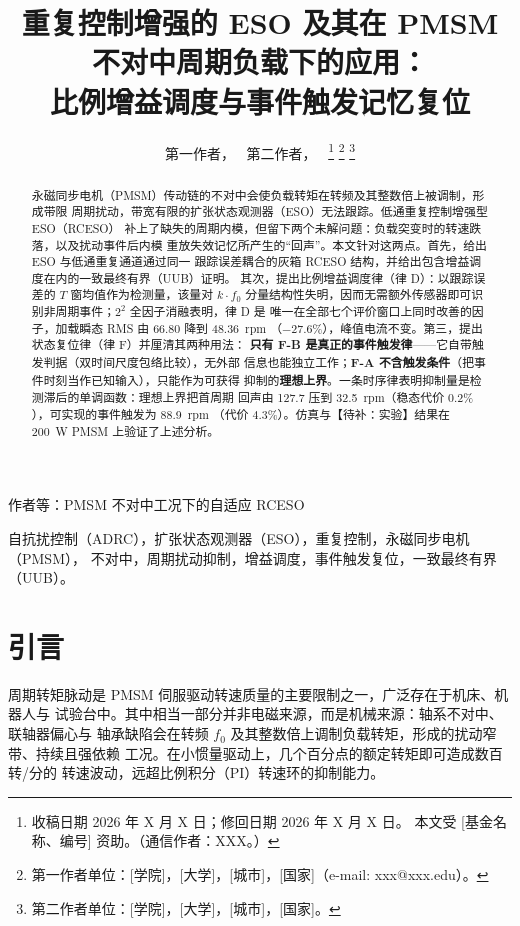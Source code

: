 \documentclass[journal]{IEEEtran}
\theoremstyle{remark}
\begin{document}
\title{重复控制增强的 ESO 及其在 PMSM 不对中周期负载下的应用：\\
比例增益调度与事件触发记忆复位}

\author{第一作者，~
        第二作者，~
\thanks{收稿日期 2026 年 X 月 X 日；修回日期 2026 年 X 月 X 日。
本文受 [基金名称、编号] 资助。（通信作者：XXX。）}
\thanks{第一作者单位：[学院]，[大学]，[城市]，[国家]（e-mail: xxx@xxx.edu）。}
\thanks{第二作者单位：[学院]，[大学]，[城市]，[国家]。}}

%
{作者等：PMSM 不对中工况下的自适应 RCESO}

\maketitle

\begin{abstract}
永磁同步电机（PMSM）传动链的不对中会使负载转矩在转频及其整数倍上被调制，形成带限
周期扰动，带宽有限的扩张状态观测器（ESO）无法跟踪。低通重复控制增强型 ESO（RCESO）
补上了缺失的周期内模，但留下两个未解问题：负载突变时的转速跌落，以及扰动事件后内模
重放失效记忆所产生的“回声”。本文针对这两点。首先，给出 ESO 与低通重复通道通过同一
跟踪误差耦合的灰箱 RCESO 结构，并给出包含增益调度在内的一致最终有界（UUB）证明。
其次，提出比例增益调度律（律 D）：以跟踪误差的 $T$ 窗均值作为检测量，该量对 $k\cdot f_0$
分量结构性失明，因而无需额外传感器即可识别非周期事件；$2^2$ 全因子消融表明，律 D 是
唯一在全部七个评价窗口上同时改善的因子，加载瞬态 RMS 由 66.80 降到 48.36~rpm
（$-27.6\%$），峰值电流不变。第三，提出状态复位律（律 F）并厘清其两种用法：
\textbf{只有 F-B 是真正的事件触发律}——它自带触发判据（双时间尺度包络比较），无外部
信息也能独立工作；\textbf{F-A 不含触发条件}（把事件时刻当作已知输入），只能作为可获得
抑制的\textbf{理想上界}。一条时序律表明抑制量是检测滞后的单调函数：理想上界把首周期
回声由 127.7 压到 32.5~rpm（稳态代价 $0.2\%$），可实现的事件触发为 88.9~rpm
（代价 $4.3\%$）。仿真与【待补：实验】结果在 200~W PMSM 上验证了上述分析。
\end{abstract}

\begin{IEEEkeywords}
自抗扰控制（ADRC），扩张状态观测器（ESO），重复控制，永磁同步电机（PMSM），
不对中，周期扰动抑制，增益调度，事件触发复位，一致最终有界（UUB）。
\end{IEEEkeywords}

\section{引言}
周期转矩脉动是 PMSM 伺服驱动转速质量的主要限制之一，广泛存在于机床、机器人与
试验台中。其中相当一部分并非电磁来源，而是机械来源：轴系不对中、联轴器偏心与
轴承缺陷会在转频 $f_0$ 及其整数倍上调制负载转矩，形成的扰动窄带、持续且强依赖
工况\cite{nandi2005}。在小惯量驱动上，几个百分点的额定转矩即可造成数百转/分的
转速波动，远超比例积分（PI）转速环的抑制能力。
\end{document}
